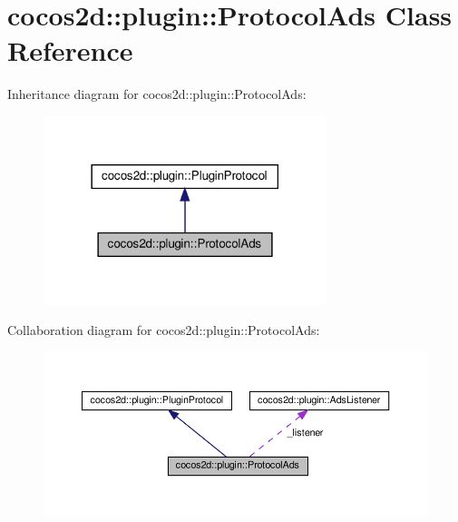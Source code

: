 \hypertarget{classcocos2d_1_1plugin_1_1ProtocolAds}{}\section{cocos2d\+:\+:plugin\+:\+:Protocol\+Ads Class Reference}
\label{classcocos2d_1_1plugin_1_1ProtocolAds}


Inheritance diagram for cocos2d\+:\+:plugin\+:\+:Protocol\+Ads\+:
\nopagebreak
\begin{figure}[H]
\begin{center}
\leavevmode
\includegraphics[width=234pt]{classcocos2d_1_1plugin_1_1ProtocolAds__inherit__graph}
\end{center}
\end{figure}


Collaboration diagram for cocos2d\+:\+:plugin\+:\+:Protocol\+Ads\+:
\nopagebreak
\begin{figure}[H]
\begin{center}
\leavevmode
\includegraphics[width=350pt]{classcocos2d_1_1plugin_1_1ProtocolAds__coll__graph}
\end{center}
\end{figure}
